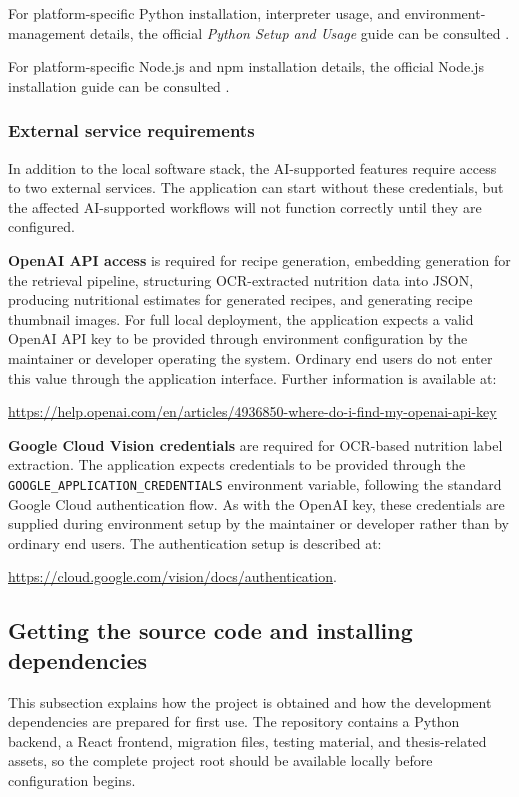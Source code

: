 For platform-specific Python installation, interpreter usage, and
environment-management details, the official \emph{Python Setup and
Usage} guide can be consulted \cite{python2026setup}.

For platform-specific Node.js and npm installation details, the
official Node.js installation guide can be consulted
\cite{node2026setup}.

\subsubsection{External service requirements}

In addition to the local software stack, the AI-supported features
require access to two external services. The application can start
without these credentials, but the affected AI-supported workflows
will not function correctly until they are configured.

\textbf{OpenAI API access} is required for recipe generation,
embedding generation for the retrieval pipeline, structuring
OCR-extracted nutrition data into JSON, producing nutritional
estimates for generated recipes, and generating recipe thumbnail
images. For full local deployment, the application expects a valid
OpenAI API key to be provided through environment configuration by
the maintainer or developer operating the system. Ordinary end
users do not enter this value through the application interface.
Further information is
available at:
\par{\footnotesize\url{https://help.openai.com/en/articles/4936850-where-do-i-find-my-openai-api-key}}

\textbf{Google Cloud Vision credentials} are required for
OCR-based nutrition label extraction. The application expects
credentials to be provided through the
\texttt{GOOGLE\_APPLICATION\_CREDENTIALS} environment variable,
following the standard Google Cloud authentication flow. As with the
OpenAI key, these credentials are supplied during environment setup
by the maintainer or developer rather than by ordinary end users.
The authentication setup is described at:
\par
\url{https://cloud.google.com/vision/docs/authentication}.

\subsection{Getting the source code and installing dependencies}

This subsection explains how the project is obtained and how the
development dependencies are prepared for first use. The repository
contains a Python backend, a React frontend, migration files,
testing material, and thesis-related assets, so the complete project
root should be available locally before configuration begins.

